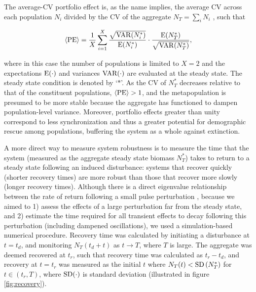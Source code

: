 \documentclass{revtex4}
\begin{document}
The average-CV portfolio effect is, as the name implies, the average CV across each population $N_i$ divided by the CV of the aggregate $N_T=\sum_i N_i$ \citep{Anderson:2013gb}, such that


\begin{equation}
\langle{\rm PE}\rangle =\frac{1}{X}\sum_{i=1}^{X} \frac{\sqrt{{\rm VAR}(N_i^*)}}{{\rm E}(N_i^*)}\cdot \frac{{\rm E}(N_T^*)}{\sqrt{{\rm VAR}(N_T^*)}},
\label{eq:pe}
\end{equation}

\noindent where in this case the number of populations is limited to $X=2$ and the expectations $\rm E(\cdot)$ and variances $\rm VAR(\cdot)$ are evaluated at the steady state.
The steady state condition is denoted by `$*$'.
As the CV of $N_T^*$ decreases relative to that of the constituent populations, $\langle{\rm PE}\rangle > 1$, and the metapopulation is presumed to be more stable because the aggregate has functioned to dampen population-level variance.
Moreover, portfolio effects greater than unity correspond to less synchronization  \citep{Loreau:2008ju,Anderson:2014cx,Yeakel:2013vz} and thus a greater potential for demographic rescue among populations, buffering the system as a whole against extinction. 

A more direct way to measure system robustness is to measure the time that the system (measured as the aggregate steady state biomass $N_T^*$) takes to return to a steady state following an induced disturbance: systems that recover quickly (shorter recovery times) are more robust than those that recover more slowly (longer recovery times).
Although there is a direct eigenvalue relationship between the rate of return following a small pulse perturbation \citep{GuckHolmes}, because we aimed to 
1) assess the effects of a large perturbation far from the steady state, and 
2) estimate the time required for all transient effects to decay following this perturbation (including dampened oscillations), we used a simulation-based numerical procedure.
Recovery time was calculated by initiating a disturbance at $t=t_d$, and monitoring $N_T(t_d+t)$ as $t\rightarrow T$, where $T$ is large. 
The aggregate was deemed recovered at $t_r$, such that recovery time was calculated as $t_r-t_d$, and recovery at $t=t_r$ was measured as the initial $t$ where $N_T(t) < {\rm SD}\left( N_T^* \right)$ for $t\in(t_r,T)$, where $\rm{SD}(\cdot)$ is standard deviation (illustrated in figure \ref{fig:recovery}).
\end{document}
